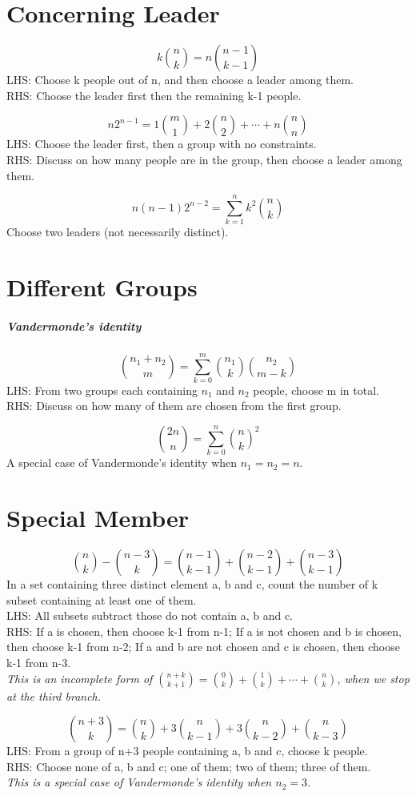 \documentclass{article}
\begin{document}
	\section{Concerning Leader}
	$$k{n \choose k} = n{n-1 \choose k-1}$$
	LHS: Choose k people out of n, and then choose a leader among them.\\
	RHS: Choose the leader first then the remaining k-1 people.

	$$n2^{n-1} = 1{m \choose 1} + 2{n \choose 2} + \cdots + n{n \choose n}$$
	LHS: Choose the leader first, then a group with no constraints.\\
	RHS: Discuss on how many people are in the group, then choose a leader among them.

	$$n(n-1)2^{n-2} = \sum_{k=1}^{n} k^2{n \choose k}$$
	Choose two leaders (not necessarily distinct).

	\section{Different Groups}
	\subparagraph{Vandermonde's identity}
	$${n_1 + n_2 \choose m} = \sum_{k=0}^{m} {n_1 \choose k} {n_2 \choose m-k}$$
	LHS: From two groups each containing $n_1$ and $n_2$ people, choose m in total.\\
	RHS: Discuss on how many of them are chosen from the first group.

	$${2n \choose n} = \sum_{k=0}^{n} {n \choose k}^2$$
	A special case of Vandermonde's identity when $n_1 = n_2 = n$.

	\section{Special Member}
	$${n \choose k} - {n-3 \choose k} = {n-1 \choose k-1} + {n-2 \choose k-1} + {n-3 \choose k-1}$$
	In a set containing three distinct element a, b and c, count the number of k subset containing at least one of them.\\
	LHS: All subsets subtract those do not contain a, b and c.\\
	RHS: If a is chosen, then choose k-1 from n-1; If a is not chosen and b is chosen, then choose k-1 from n-2; If a and b are not chosen and c is chosen, then choose k-1 from n-3.\\
	\textit{This is an incomplete form of ${n+k \choose k+1} = {0 \choose k} + {1 \choose k} + \cdots + {n \choose k}$, when we stop at the third branch.}

	$${n+3 \choose k} = {n \choose k} + 3{n \choose k-1} + 3{n \choose k-2} + {n \choose k-3}$$
	LHS: From a group of n+3 people containing a, b and c, choose k people.\\
	RHS: Choose none of a, b and c; one of them; two of them; three of them.\\
	\textit{This is a special case of Vandermonde's identity when $n_2 = 3$.}
\end{document}
